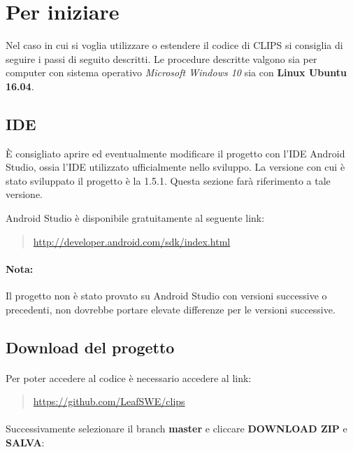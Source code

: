 \documentclass[../ManualeSviluppatore.tex]{subfiles}
\begin{document}
\section{Per iniziare}

	Nel caso in cui si voglia utilizzare o estendere il codice di CLIPS si consiglia di seguire i passi di seguito descritti. Le procedure descritte valgono sia per computer con sistema operativo \textit{Microsoft Windows 10} sia con \textbf{Linux Ubuntu 16.04}.

	\subsection{IDE}
		È consigliato aprire ed eventualmente modificare il progetto con l'IDE \gls{Android Studio}, ossia l'IDE utilizzato ufficialmente nello sviluppo. La versione con cui è stato sviluppato il progetto è la 1.5.1. Questa sezione farà riferimento a tale versione.
		
	 \gls{Android Studio} è disponibile gratuitamente al seguente link:
		\begin{quote}
			\centering
			\url{http://developer.android.com/sdk/index.html}
		\end{quote}
		
		\paragraph*{Nota:} 
			Il progetto non è stato provato su \gls{Android Studio} con versioni successive o precedenti, non dovrebbe portare elevate differenze per le versioni successive.
		
		
		
		
	\subsection{Download del progetto}
		\paragraph*{}
			Per poter accedere al codice è necessario accedere al link:
		\begin{quote}
			\centering
			\url{https://github.com/LeafSWE/clips}
		\end{quote}

		\paragraph*{}
			Successivamente selezionare il branch \textbf{master} e cliccare \textbf{DOWNLOAD ZIP} e \textbf{SALVA}:
			
\end{document}

